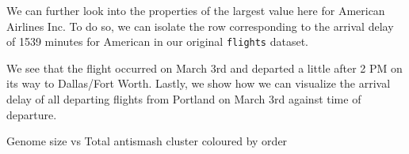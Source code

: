 \documentclass[12pt,twoside]{reedthesis}
\begin{document}
  \begin{Shaded}
  \begin{Highlighting}[]
  \end{Highlighting}
  \end{Shaded}
  
  We can further look into the properties of the largest value here for
  American Airlines Inc. To do so, we can isolate the row corresponding to
  the arrival delay of 1539 minutes for American in our original
  \texttt{flights} dataset.
  
  \begin{Shaded}
  \end{Shaded}
  
  We see that the flight occurred on March 3rd and departed a little after
  2 PM on its way to Dallas/Fort Worth. Lastly, we show how we can
  visualize the arrival delay of all departing flights from Portland on
  March 3rd against time of departure.
  
  \begin{Shaded}
  \end{Shaded}
  
  Genome size vs Total antismash cluster coloured by order
  
\end{document}
